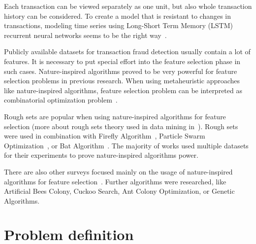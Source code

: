 \documentclass[runningheads]{llncs}
\begin{document}
Each transaction can be viewed separately as one unit, but also whole transaction history can be considered. To create a model that is resistant to changes in transactions, modeling time series using Long-Short Term Memory (LSTM) recurrent neural networks seems to be the right way~\cite{Wiese2009}.

Publicly available datasets for transaction fraud detection usually contain a lot of features. It is necessary to put special effort into the feature selection phase in such cases. Nature-inspired algorithms proved to be very powerful for feature selection problems in previous research. When using metaheuristic approaches like nature-inspired algorithms, feature selection problem can be interpreted as combinatorial optimization problem~\cite{Wang2016}.

Rough sets are popular when using nature-inspired algorithms for feature selection (more about rough sets theory used in data mining in~\cite{Slimani2013}). Rough sets were used in combination with Firefly Algorithm~\cite{Banati2011}, Particle Swarm Optimization~\cite{Wang2007}, or Bat Algorithm~\cite{Emary2014}. The majority of works used multiple datasets for their experiments to prove nature-inspired algorithms power.

There are also other surveys focused mainly on the usage of nature-inspired algorithms for feature selection~\cite{Kauser2018,Wang2016,Yang2020}. Further algorithms were researched, like Artificial Bees Colony, Cuckoo Search, Ant Colony Optimization, or Genetic Algorithms.



\section{Problem definition}


\end{document}
